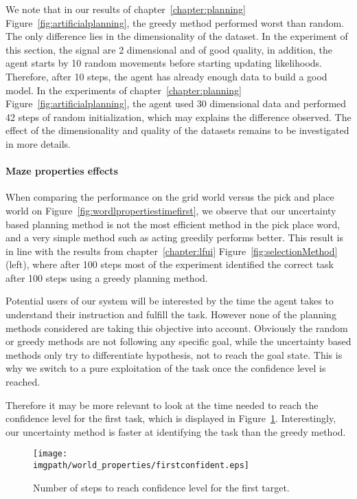 We note that in our results of chapter~\ref{chapter:planning} Figure~\ref{fig:artificialplanning}, the greedy method performed worst than random. The only difference lies in the dimensionality of the dataset. In the experiment of this section, the signal are 2 dimensional and of good quality, in addition, the agent starts by 10 random movements before starting updating likelihoods. Therefore, after 10 steps, the agent has already enough data to build a good model. In the experiments of chapter~\ref{chapter:planning} Figure~\ref{fig:artificialplanning}, the agent used 30 dimensional data and performed 42 steps of random initialization, which may explains the difference observed. The effect of the dimensionality and quality of the datasets remains to be investigated in more details.

\paragraph{Maze properties effects}

When comparing the performance on the grid world versus the pick and place world on Figure~\ref{fig:wordlpropertiestimefirst}, we observe that our uncertainty based planning method is not the most efficient method in the pick place word, and a very simple method such as acting greedily performs better. This result is in line with the results from chapter~\ref{chapter:lfui} Figure~\ref{fig:selectionMethod} (left), where after 100 steps most of the experiment identified the correct task after 100 steps using a greedy planning method.

Potential users of our system will be interested by the time the agent takes to understand their instruction and fulfill the task. However none of the planning methods considered are taking this objective into account. Obviously the random or greedy methods are not following any specific goal, while the uncertainty based methods only try to differentiate hypothesis, not to reach the goal state. This is why we switch to a pure exploitation of the task once the confidence level is reached.

Therefore it may be more relevant to look at the time needed to reach the confidence level for the first task, which is displayed in Figure~\ref{fig:wordlpropertiesconfidencefirst}. Interestingly, our uncertainty method is faster at identifying the task than the greedy method.

\begin{figure}[!htbp]
\centering
\texttt{[image: \\imgpath/world\_properties/firstconfident.eps]}
\caption{Number of steps to reach confidence level for the first target.}
\label{fig:wordlpropertiesconfidencefirst}
\end{figure} 

